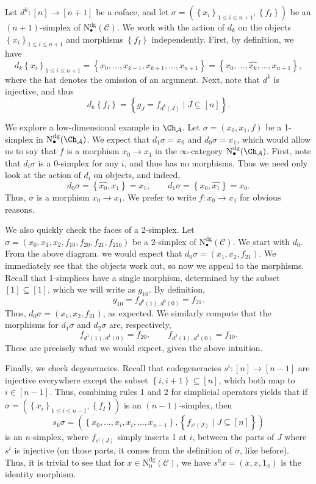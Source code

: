 Let $d^k : [n] \to [n+1]$ be a coface, and let $\sigma =\left( \left\{ x_i \right\}_{1\leq i\leq n+1} ,\left\{ f_I \right\}  \right) $ be an $(n+1)$-simplex of $\mathrm{N} ^{\mathrm{dg} } _{\bullet} (\mathcal{C} )$. We work with the action of $d_k$ on the objects $\left\{ x_i \right\} _{1\leq i\leq n+1}$ and morphisms $\left\{ f_I \right\} $ independently. First, by definition, we have
\[
	d_k \left\{ x_i \right\}_{1\leq i\leq n+1} =\left\{ x_0, \ldots , x_{k-1} ,x_{k+1} , \ldots , x_{n+1}  \right\} =\left\{ x_0, \ldots , \widehat{x_k}, \ldots , x_{n+1}  \right\} ,
\]
where the hat denotes the omission of an argument. Next, note that $d^k$ is injective, and thus
\[
	d_k\left\{ f_I \right\} =\left\{g_J = f_{d^k(J)}\mid J \subseteq [n] \right\} 
.\]

We explore a low-dimensional example in $\Ch_{\mathcal{A} } $. Let $\sigma = (x_0,x_1,f)$ be a 1-simplex in $\mathrm{N} ^{\mathrm{dg} } _{\bullet} (\Ch_{\mathcal{A} }) $. We expect that $d_1\sigma =x_0$ and $d_0\sigma =x_1$, which would allow us to say that $f$ is a morphism $x_0\to x_1$ in the $\infty $-category $\mathrm{N} ^{\mathrm{dg} } _{\bullet} (\Ch_{\mathcal{A} } )$. First, note that $d_i\sigma $ is a 0-simplex for any $i$, and thus has no morphisms. Thus we need only look at the action of $d_i$ on objects, and indeed,
\[
	d_0\sigma =\left\{ \widehat{x_0} ,x_1 \right\} =x_1,\qquad d_1\sigma =\left\{ x_0, \widehat{x_1}  \right\} =x_0
.\]
Thus, $\sigma$ is a morphism $x_0\to x_1$. We prefer to write $f : x_0 \to x_1$ for obvious reasons.

We also quickly check the faces of a 2-simplex. Let $\sigma =(x_0,x_1,x_2,f_{10} ,f_{20} ,f_{21} ,f_{210} )$ be a 2-simplex of $\mathrm{N} ^{\mathrm{dg} } _{\bullet} (\mathcal{C} )$. We start with $d_0$. From the above diagram. we would expect that $d_0\sigma =(x_1,x_2,f_{21} )$. We immediately see that the objects work out, so now we appeal to the morphisms. Recall that 1-simplices have a single morphism, determined by the subset $[1]\subseteq [1]$, which we will write as $g_{10} $. By definition,
\[
	g_{10} =f_{d^0(1),d^0(0)} =f_{21}
.\]
Thus, $d_0\sigma =(x_1,x_2,f_{21} )$, as expected. We similarly compute that the morphisms for $d_1\sigma $ and $d_2\sigma $ are, respectively,
\[
	f_{d^1(1),d^1(0)} =f_{20} ,\qquad f_{d^2(1),d^2(0)} =f_{10} 
.\]
These are precisely what we would expect, given the above intuition.

Finally, we check degeneracies. Recall that codegeneracies $s^i : [n] \to [n-1]$ are injective everywhere except the subset $\left\{ i,i+1 \right\} \subseteq [n]$, which both map to $i\in[n-1]$. Thus, combining rules 1 and 2 for simplicial operators yields that if $\sigma = \left( \left\{ x_i \right\} _{1\leq i\leq n-1} ,\left\{ f_I \right\}  \right) $ is an $(n-1)$-simplex, then
\[
	s_k\sigma =\left( \left\{ x_0, \ldots , x_i,x_i, \ldots , x_{n-1}  \right\} ,\left\{ f_{s^i(J)} \mid J\subseteq [n] \right\}  \right) 
\]
is an $n$-simplex, where $f_{s^i(J)} $ simply inserts 1 at $i$, between the parts of $J$ where $s^i$ is injective (on those parts, it comes from the definition of $\sigma $, like before). Thus, it is trivial to see that for $x\in \mathrm{N} ^{\mathrm{dg} } _0(\mathcal{C} )$, we have $s^0x = (x,x,1_x)$ is the identity morphism.

